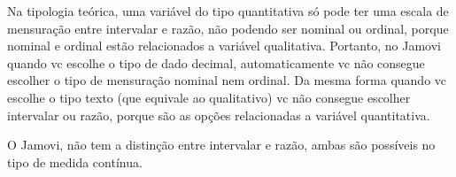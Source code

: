 \documentclass[a4paper,12pt]{book}
\begin{document}
Na tipologia teórica, uma variável do tipo quantitativa só pode ter uma escala de mensuração entre intervalar e razão, não podendo ser nominal ou ordinal, porque nominal e ordinal estão relacionados a variável qualitativa. Portanto, no Jamovi quando vc escolhe o tipo de dado decimal, automaticamente vc não consegue escolher o tipo de mensuração nominal nem ordinal. Da mesma forma quando vc escolhe o tipo texto (que equivale ao qualitativo) vc não consegue escolher intervalar ou razão, porque são as opções relacionadas a variável quantitativa.

O Jamovi, não tem a distinção entre intervalar e razão, ambas são possíveis no tipo de medida contínua.



\end{document}
